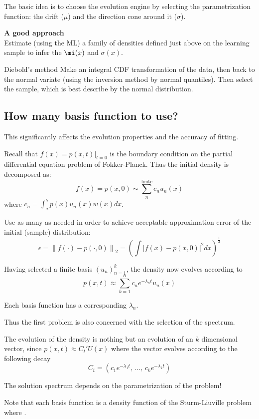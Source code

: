 \documentclass[a4paper]{article}
\newcommand{\brac}[1]{{\left ( #1 \right )}}
\newcommand{\induc}[1]{{\left . #1 \right \vert}}
\newcommand{\abs}[1]{{\left | #1 \right |}}
\newcommand{\nrm}[1]{{\left\| #1 \right \|}}
\begin{document}
The basic idea is to choose the evolution engine by selecting the parametrization function: the drift ($\mu$) and the direction cone around it ($\sigma$).

\noindent\textbf{A good approach}\hfill \\
Estimate (using the ML) a family of densities defined just above on the learning sample to infer the $\mi(x)$ and $\sigma(x)$.

Diebold's method 
Make an integral CDF transformation of the data, then back to the normal variate (using the inversion method by normal quantiles). Then select the sample, which is best describe by the normal distribution.


\subsection{How many basis function to use?} %
\label{sub:the_effective_subspace_dimension}

This significantly affects the evolution properties and the accuracy of fitting.

Recall that $f(x) = \induc{p(x,t)}_{t=0}$ is the boundary condition on the partial differential equation problem of Fokker-Planck. Thus the initial density is decomposed as:
\[f(x) = p(x, 0) \sim \sum_n^{\text{finite}} c_n u_n(x)\]
where $c_n = \int_a^b p(x) u_n(x) w(x) dx$.

Use as many as needed in order to achieve acceptable approximation error of the initial (sample) distribution:
\[\epsilon = \nrm{f(\cdot) - p(\cdot,0)}_2 = \brac{\int \abs{f(x)-p(x,0)}^2 dx}^\frac{1}{2}\]

Having selected a finite basis $\brac{u_n}_{n=1}^k$, the density now evolves according to
\[p(x,t) \approx \sum_{k=1}^n c_n e^{-\lambda_n t} u_n(x)\]

Each basis function has a corresponding $\lambda_n$.

Thus the first problem is also concerned with the selection of the spectrum.

The evolution of the density is nothing but an evolution of an $k$ dimensional vector, since $p(x, t) \approx C_t' U(x)$
where the vector evolves according to the following decay
\[C_t = \brac{ c_1 e^{-\lambda_1 t},\,\ldots,\, c_k e^{-\lambda_k t} }\]

The solution spectrum depends on the parametrization of the problem!

Note that each basis function is a density function of the Sturm-Liuville problem where .
\end{document}
